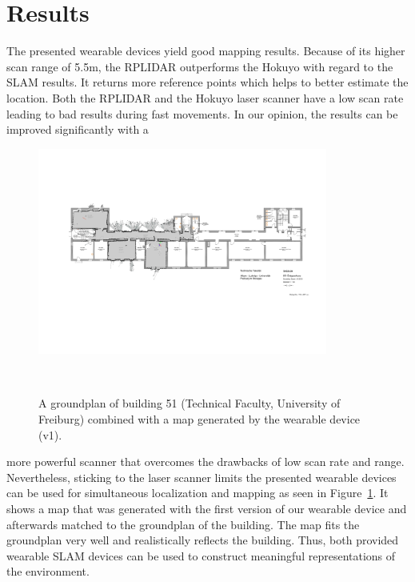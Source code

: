 \documentclass{sigchi-ext}
\begin{document}
\section{Results}
The presented wearable devices yield good mapping results. Because of its higher scan range of 5.5m, the RPLIDAR outperforms the Hokuyo with regard to the SLAM results. It returns more reference points which helps to better estimate the location. Both the RPLIDAR and the Hokuyo laser scanner have a low scan rate leading to bad results during fast movements. In our opinion, the results can be improved significantly with a 

\begin{figure}[!h]
	\hspace{1cm}
	\includegraphics[width=0.85\textwidth]{51.png}
	\caption{A groundplan of building 51 (Technical Faculty, University of Freiburg) combined with a map generated by the wearable device (v1).}~\label{fig:b51map}
\end{figure}

more powerful scanner that overcomes the drawbacks of low scan rate and range. Nevertheless, sticking to the laser scanner limits the presented wearable devices can be used for simultaneous localization and mapping as seen in Figure~\ref{fig:b51map}. It shows a map that was generated with the first version of our wearable device and afterwards matched to the groundplan of the building. The map fits the groundplan very well and realistically reflects the building. Thus, both provided wearable SLAM devices can be used to construct meaningful representations of the environment.



%
%

\balance{} 
\end{document}
